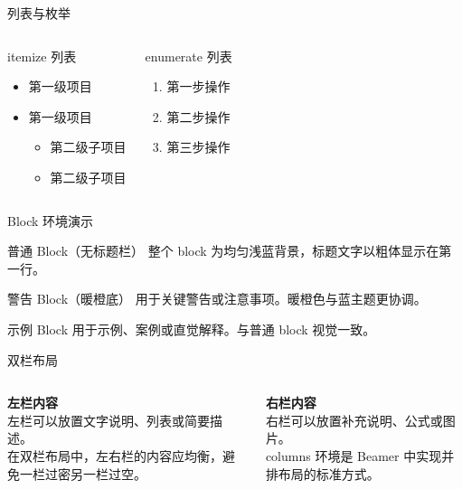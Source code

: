 \documentclass[aspectratio=169, 11pt]{beamer}
\begin{document}
\begin{frame}{列表与枚举}
\begin{columns}
\begin{block}{itemize 列表}
  \begin{itemize}
    \item 第一级项目
    \item 第一级项目
    \begin{itemize}
      \item 第二级子项目
      \item 第二级子项目
    \end{itemize}
  \end{itemize}
\end{block}

\begin{block}{enumerate 列表}
  \begin{enumerate}
    \item 第一步操作
    \item 第二步操作
    \item 第三步操作
  \end{enumerate}
\end{block}
\end{columns}
\end{frame}

\begin{frame}{Block 环境演示}
\begin{block}{普通 Block（无标题栏）}
  整个 block 为均匀浅蓝背景，标题文字以粗体显示在第一行。
\end{block}

\vspace{0.3cm}

\begin{alertblock}{警告 Block（暖橙底）}
  用于关键警告或注意事项。暖橙色与蓝主题更协调。
\end{alertblock}

\vspace{0.3cm}

\begin{exampleblock}{示例 Block}
  用于示例、案例或直觉解释。与普通 block 视觉一致。
\end{exampleblock}
\end{frame}

\begin{frame}{双栏布局}
\begin{columns}
\centering
\textbf{左栏内容}\\
\vspace{0.3cm}
\footnotesize
左栏可以放置文字说明、列表或简要描述。\\
在双栏布局中，左右栏的内容应均衡，避免一栏过密另一栏过空。

\centering
\textbf{右栏内容}\\
\vspace{0.3cm}
\footnotesize
右栏可以放置补充说明、公式或图片。\\
columns 环境是 Beamer 中实现并排布局的标准方式。
\end{columns}
\end{frame}
\end{document}

